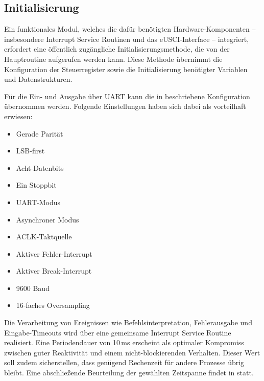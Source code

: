 
\newpage
\subsection{Initialisierung}
\label{sec:Init}

Ein funktionales Modul, welches die daf\"ur ben\"otigten Hardware-Komponenten -- insbesondere Interrupt Service Routinen und das eUSCI-Interface -- integriert, erfordert eine \"offentlich zug\"angliche Initialisierungsmethode, die von der Hauptroutine aufgerufen werden kann. Diese Methode \"ubernimmt die Konfiguration der Steuerregister sowie die Initialisierung ben\"otigter Variablen und Datenstrukturen.

F\"ur die Ein- und Ausgabe \"uber UART kann die in  beschriebene Konfiguration \"ubernommen werden. Folgende Einstellungen haben sich dabei als vorteilhaft erwiesen:

\begin{multicols}{2}
	\begin{itemize}
		\item Gerade Parit\"at
		\item LSB-first
		\item Acht-Datenbits
		\item Ein Stoppbit
		\item UART-Modus
		\item Asynchroner Modus
	\end{itemize}	
\vfill\null
\columnbreak
	\begin{itemize}
		\item ACLK-Taktquelle
		\item Aktiver Fehler-Interrupt
		\item Aktiver Break-Interrupt
		\item 9600 Baud
		\item 16-faches Oversampling
	\end{itemize}
\vfill\null
\end{multicols}

Die Verarbeitung von Ereignissen wie Befehlsinterpretation, Fehlerausgabe und \\Eingabe-Timeouts wird \"uber eine gemeinsame Interrupt Service Routine realisiert. Eine Periodendauer von 10\,ms erscheint als optimaler Kompromiss zwischen guter Reaktivit\"at und einem nicht-blockierenden Verhalten. Dieser Wert soll zudem sicherstellen, dass gen\"ugend Rechenzeit f\"ur andere Prozesse \"ubrig bleibt. Eine abschlie{\ss}ende Beurteilung der gew\"ahlten Zeitspanne findet in  statt. 

